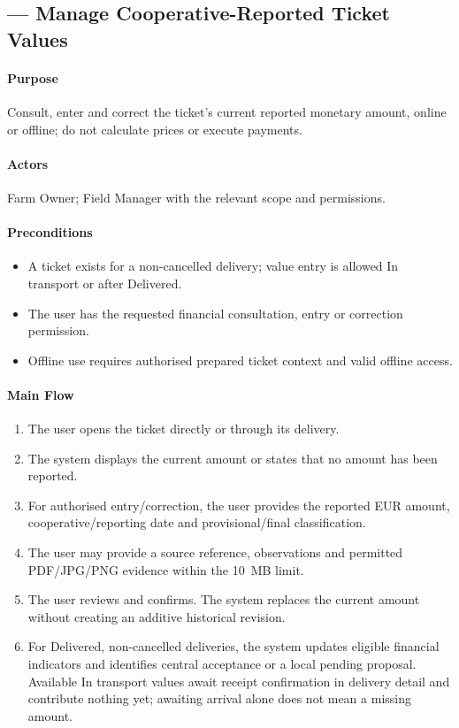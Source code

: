 \subsection{ --- Manage Cooperative-Reported Ticket Values}\label{uc:18}

\paragraph{Purpose}
Consult, enter and correct the ticket's current reported monetary amount, online or offline; do not calculate prices or execute payments.

\paragraph{Actors}
Farm Owner; Field Manager with the relevant scope and permissions.

\paragraph{Preconditions}
\begin{itemize}
\item A ticket exists for a non-cancelled delivery; value entry is allowed In transport or after Delivered.
\item The user has the requested financial consultation, entry or correction permission.
\item Offline use requires authorised prepared ticket context and valid offline access.
\end{itemize}

\paragraph{Main Flow}
\begin{enumerate}
\item The user opens the ticket directly or through its delivery.
\item The system displays the current amount or states that no amount has been reported.
\item For authorised entry/correction, the user provides the reported EUR amount, cooperative/reporting date and provisional/final classification.
\item The user may provide a source reference, observations and permitted PDF/JPG/PNG evidence within the 10~MB limit.
\item The user reviews and confirms. The system replaces the current amount without creating an additive historical revision.
\item For Delivered, non-cancelled deliveries, the system updates eligible financial indicators and identifies central acceptance or a local pending proposal. Available In transport values await receipt confirmation in delivery detail and contribute nothing yet; awaiting arrival alone does not mean a missing amount.
\end{enumerate}

